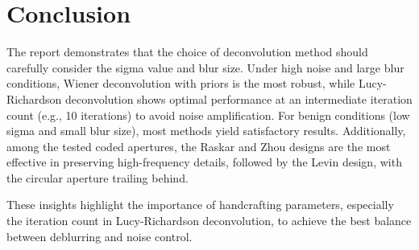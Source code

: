 \documentclass[a4paper,10pt]{article}
\begin{document}
\section{Conclusion}
The report demonstrates that the choice of deconvolution method should
 carefully consider the sigma value and blur size. Under high noise and
 large blur conditions, Wiener deconvolution with priors is the most robust, while 
 Lucy-Richardson deconvolution shows optimal performance at an intermediate iteration count (e.g., 10 iterations) 
 to avoid noise amplification. For benign conditions (low sigma and small blur size), most methods yield satisfactory
  results. Additionally, among the tested coded apertures, the Raskar and Zhou designs are the most effective 
  in preserving high-frequency details, followed by the Levin design, with the circular aperture trailing behind.

These insights highlight the importance of handcrafting parameters,
 especially the iteration count in Lucy-Richardson deconvolution, to achieve 
 the best balance between deblurring and noise control. 
\end{document}
